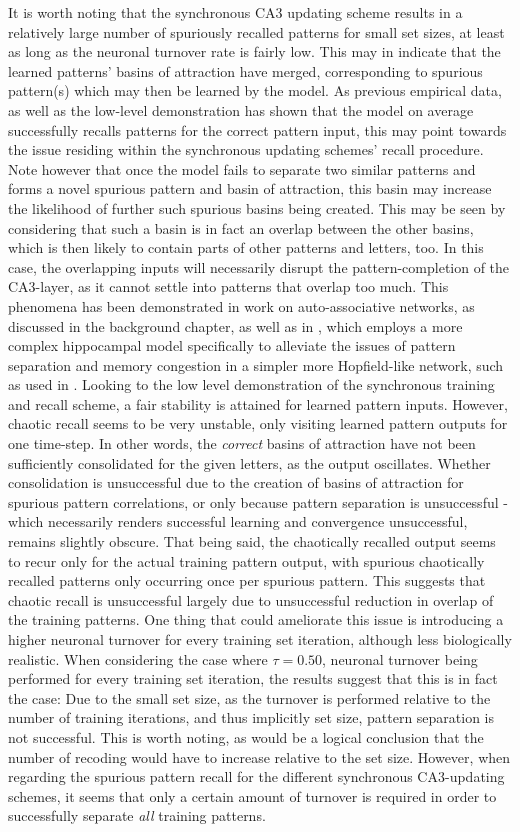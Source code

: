 It is worth noting that the synchronous CA3 updating scheme results in a relatively large number of spuriously recalled patterns for small set sizes, at least as long as the neuronal turnover rate is fairly low. This may in indicate that the learned patterns' basins of attraction have merged, corresponding to spurious pattern(s) which may then be learned by the model. As previous empirical data, as well as the low-level demonstration has shown that the model on average successfully recalls patterns for the correct pattern input, this may point towards the issue residing within the synchronous updating schemes' recall procedure. 
Note however that once the model fails to separate two similar patterns and forms a novel spurious pattern and basin of attraction, this basin may increase the likelihood of further such spurious basins being created. This may be seen by considering that such a basin is in fact an overlap between the other basins, which is then likely to contain parts of other patterns and letters, too. In this case, the overlapping inputs will necessarily disrupt the pattern-completion of the CA3-layer, as it cannot settle into patterns that overlap too much. This phenomena has been demonstrated in work on auto-associative networks, as discussed in the background chapter, as well as in \citep{Hattori2014}, which employs a more complex hippocampal model specifically to alleviate the issues of pattern separation and memory congestion in a simpler more Hopfield-like network, such as used in \citep{Hattori2010}.
Looking to the low level demonstration of the synchronous training and recall scheme, a fair stability is attained for learned pattern inputs. However, chaotic recall seems to be very unstable, only visiting learned pattern outputs for one time-step. In other words, the \textit{correct} basins of attraction have not been sufficiently consolidated for the given letters, as the output oscillates. Whether consolidation is unsuccessful due to the creation of basins of attraction for spurious pattern correlations, or only because pattern separation is unsuccessful - which necessarily renders successful learning and convergence unsuccessful, remains slightly obscure. That being said, the chaotically recalled output seems to recur only for the actual training pattern output, with spurious chaotically recalled patterns only occurring once per spurious pattern. This suggests that chaotic recall is unsuccessful largely due to unsuccessful reduction in overlap of the training patterns. One thing that could ameliorate this issue is introducing a higher neuronal turnover for every training set iteration, although less biologically realistic. When considering the case where $\tau=0.50$, neuronal turnover being performed for every training set iteration, the results suggest that this is in fact the case: Due to the small set size, as the turnover is performed relative to the number of training iterations, and thus implicitly set size, pattern separation is not successful. This is worth noting, as would be a logical conclusion that the number of recoding would have to increase relative to the set size. However, when regarding the spurious pattern recall for the different synchronous CA3-updating schemes, it seems that only a certain amount of turnover is required in order to successfully separate \textit{all} training patterns.

